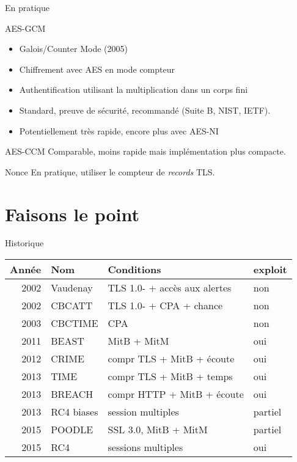 \documentclass{mpg-ep-slides}
\begin{document}
\begin{frame}{En pratique}
  \begin{block}{AES-GCM}
    \begin{itemize}
      \item Galois/Counter Mode (2005)
      \item Chiffrement avec AES en mode compteur
      \item Authentification utilisant la multiplication dans un corps fini
      \item Standard, preuve de sécurité, recommandé (Suite B, NIST, IETF).
      \item Potentiellement très rapide, encore plus avec AES-NI
    \end{itemize}
  \end{block}

  \begin{block}{AES-CCM}
    Comparable, moins rapide mais implémentation plus compacte.
  \end{block}

  \begin{block}{Nonce}
    En pratique, utiliser le compteur de \emph{records} TLS.
  \end{block}
\end{frame}


\section[Point]{Faisons le point}
\tocsect

\begin{frame}{Historique}
  \begin{tabular}{rlll}
    \toprule
    Année & Nom & Conditions & exploit \\
    \midrule
    2002 & Vaudenay   & TLS 1.0- + accès aux alertes    & non \\
    2002 & CBCATT     & TLS 1.0- + CPA + chance         & non \\
    2003 & CBCTIME    & CPA                             & non \\
    2011 & BEAST      & MitB + MitM                     & oui \\
    2012 & CRIME      & compr TLS + MitB + écoute       & oui \\
    2013 & TIME       & compr TLS + MitB + temps        & oui \\
    2013 & BREACH     & compr HTTP + MitB + écoute      & oui \\
    2013 & RC4 biases & session multiples               & partiel \\
    2015 & POODLE     & SSL 3.0, MitB + MitM            & partiel \\
    2015 & RC4        & sessions multiples              & oui \\
    \bottomrule
  \end{tabular}
\end{frame}
\end{document}
